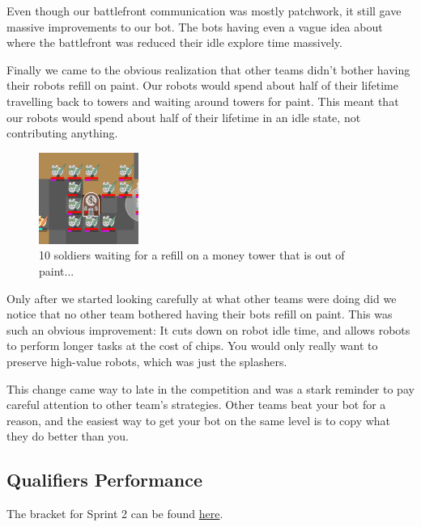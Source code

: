 \medskip

Even though our battlefront communication was mostly patchwork, it still gave massive improvements to our bot. The bots having even a vague idea about where the battlefront was reduced their idle explore time massively.

\medskip

Finally we came to the obvious realization that other teams didn't bother having their robots refill on paint. Our robots would spend about half of their lifetime travelling back to towers and waiting around towers for paint. This meant that our robots would spend about half of their lifetime in an idle state, not contributing anything.

\begin{figure}[h]
    \centering
    \includegraphics[scale=1]{images/waiting_for_refill.png}
    \caption{10 soldiers waiting for a refill on a money tower that is out of paint...}
\end{figure}

\medskip

Only after we started looking carefully at what other teams were doing did we notice that no other team bothered having their bots refill on paint. This was such an obvious improvement: It cuts down on robot idle time, and allows robots to perform longer tasks at the cost of chips. You would only really want to preserve high-value robots, which was just the splashers.

\medskip

This change came way to late in the competition and was a stark reminder to pay careful attention to other team's strategies. Other teams beat your bot for a reason, and the easiest way to get your bot on the same level is to copy what they do better than you.

\subsection{Qualifiers Performance}

The bracket for Sprint 2 can be found \href{https://challonge.com/bc25javausquals}{here}.

\medskip

